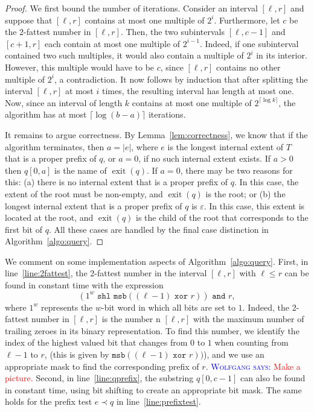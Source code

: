\documentclass[a4paper,11pt]{article}
\newcommand{\eps}{\varepsilon}
\newcommand{\?}{\mskip1.5mu}
\DeclareMathOperator{\exit}{exit}
\newcommand{\aremark}[3]{\textcolor{blue}{\textsc{#1 #2:}}
  \textcolor{red}{\textsf{#3}}}
\newcommand{\wolfgang}[2][says]{\aremark{Wolfgang}{#1}{#2}}
\begin{document}
\begin{proof}
We first bound the number of iterations. Consider
an interval $[\ell, r]$ and suppose that
$[\ell, r]$ contains at most one multiple
of $2^i$. Furthermore, let $c$ be the 
$2$-fattest number in $[\ell, r]$.
Then, the two subintervals $[\ell, c - 1]$ and 
$[c + 1, r]$ each contain at most one multiple 
of $2^{i-1}$. Indeed, if one subinterval 
contained two such multiples, it would also 
contain a multiple of $2^i$ in its interior. 
However, this multiple would have to be $c$, 
since $[\ell, r]$ contains no other multiple 
of $2^i$, a contradiction. It now follows 
by induction that after splitting the 
interval $[\ell, r]$ at most $i$ times, the 
resulting interval has length at most one. 
Now, since an interval of length $k$ contains at most one multiple of 
$2^{\lceil\log k\rceil}$, the algorithm
has at most $\lceil\log(b-a)\rceil$ iterations.

It remains to argue correctness. 
By Lemma~\ref{lem:correctness}, we know
that if the algorithm terminates, then
$a = |e|$, where $e$ is the longest internal
extent of $T$ that is a proper prefix of $q$,
or $a = 0$, if no such internal extent exists. If $a > 0$ 
then $q[0, a]$ is the name of $\exit(q)$.
If $a = 0$, there may be two 
reasons for this: (a) there is no internal
extent that is a proper prefix of $q$. In this case,
the extent of the root must be non-empty, and
$\exit(q)$ is the root; or (b) the longest internal
extent that is a proper prefix of $q$ is $\eps$.
In this case, this extent is located at the root, and 
$\exit(q)$ is the child of the root
that corresponds to the first bit
of $q$.
All these cases are handled by the
final case distinction in Algorithm~\ref{algo:query}.
\end{proof}

We comment on some implementation aspects of 
Algorithm~\ref{algo:query}.
First, in line~\ref{line:2fattest}, the 2-fattest
number in the interval $[\ell, r]$ with $\ell \leq r$
can be found in constant time with the expression 
\[
(1^w \texttt{ shl } 
\texttt{msb}((\ell - 1) \texttt{ xor } r)) \texttt{ and } r,
\]
where $1^w$ represents the $w$-bit word in which all bits
are set to $1$. Indeed, the 2-fattest number in $[\ell,r]$
is the number n $[\ell, r]$ with the maximum number of trailing zeroes
in its binary representation. To find this number, we identify
the index of the highest valued bit that changes from $0$ to
$1$ when counting from $\ell - 1$ to $r$, (this is
given by $\texttt{msb}((\ell - 1) \texttt{ xor } r))$), and 
we use an appropriate mask to find the corresponding
prefix of $r$. \wolfgang{Make a picture.}
Second, in line~\ref{line:qprefix}, the substring $q[0, c-1]$ 
can also be found in constant
time, using bit shifting to create an appropriate bit mask.
The same holds for the prefix test $e \prec q$ in line~\ref{line:prefixtest}.
\end{document}
